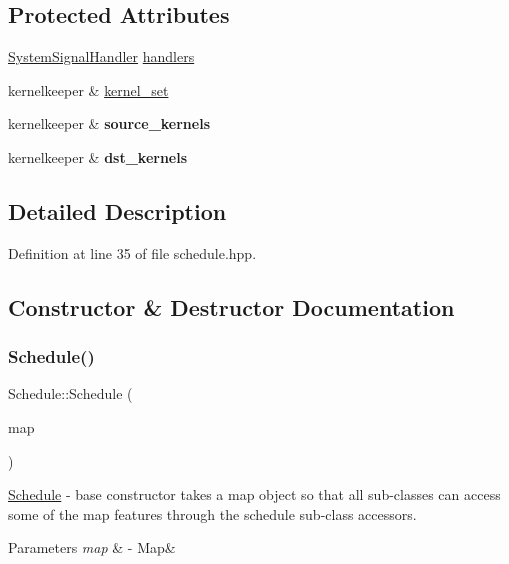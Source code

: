 \subsection*{Protected Attributes}
\begin{DoxyCompactItemize}
\item 
\hyperlink{class_system_signal_handler}{System\+Signal\+Handler} \hyperlink{class_schedule_ad248e99611a87776fb411836cd46a603}{handlers}
\item 
kernelkeeper \& \hyperlink{class_schedule_a1a448b0d48e656f94db65a70cedd8eed}{kernel\+\_\+set}
\item 
\hypertarget{class_schedule_ad4c895eb77d8287a9a19215cced7af7b}{}\label{class_schedule_ad4c895eb77d8287a9a19215cced7af7b} 
kernelkeeper \& {\bfseries source\+\_\+kernels}
\item 
\hypertarget{class_schedule_aebf2c26334eae760032d82a016898043}{}\label{class_schedule_aebf2c26334eae760032d82a016898043} 
kernelkeeper \& {\bfseries dst\+\_\+kernels}
\end{DoxyCompactItemize}


\subsection{Detailed Description}


Definition at line 35 of file schedule.\+hpp.



\subsection{Constructor \& Destructor Documentation}
\hypertarget{class_schedule_ae3fcf18fa8bdbe2ac438962a324cf433}{}\label{class_schedule_ae3fcf18fa8bdbe2ac438962a324cf433} 
\subsubsection{\texorpdfstring{Schedule()}{Schedule()}}
{\footnotesize\ttfamily Schedule\+::\+Schedule (\begin{DoxyParamCaption}\item[{\hyperlink{classraft_1_1map}{raft\+::map} \&}]{map }\end{DoxyParamCaption})}

\hyperlink{class_schedule}{Schedule} -\/ base constructor takes a map object so that all sub-\/classes can access some of the map features through the schedule sub-\/class accessors. 
\begin{DoxyParams}{Parameters}
{\em map} & -\/ Map\& \\
\hline
\end{DoxyParams}


